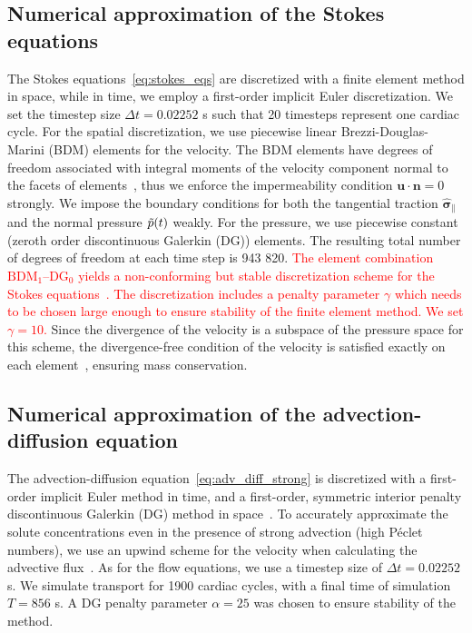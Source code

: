 \documentclass[fleqn]{wlscirep}
\newcommand{\nn}{\mathbf{n}}
\newcommand{\uu}{\mathbf{u}}
\newcommand{\bsig}{\bm{\sigma}}
\newcommand{\bsigpar}{\hat{\bsig}_{\parallel}}
\newcommand{\fixme}[1]{\textcolor{red}{#1}}
\begin{document}
\subsection*{Numerical approximation of the Stokes equations}

The Stokes equations~\eqref{eq:stokes_eqs} are discretized with a finite element method in space, while in time, we employ a first-order implicit Euler discretization.
We set the timestep size $\Delta t = 0.02252$ s such that 20 timesteps represent one cardiac cycle. For the spatial discretization, we use piecewise linear Brezzi-Douglas-Marini (BDM) elements for the velocity.
The BDM elements have degrees of freedom associated with integral moments of the velocity component normal to the facets of elements~\cite{Brezzi1985TwoProblems}, thus we enforce the impermeability condition $\uu\cdot\nn=0$ strongly.
We impose the boundary conditions for both the tangential traction $\bsigpar$ and the normal pressure $\Tilde{p}(t)$ weakly.
For the pressure, we use piecewise constant (zeroth order discontinuous Galerkin (DG)) elements.
The resulting total number of degrees of freedom at each time step is 943 820.
\fixme{The element combination $\mathrm{BDM}_1$--$\mathrm{DG}_{0}$ yields a non-conforming but stable discretization scheme for the Stokes equations~\cite{Stenberg1989SomeEquations}.
The discretization includes a penalty parameter $\gamma$ which needs to be chosen large enough to ensure stability of the finite element method. We set $\gamma=10$.}
Since the divergence of the velocity is a subspace of the pressure space for this scheme, the divergence-free condition of the velocity is satisfied exactly on each element~\cite{Boffi2008FiniteProblem}, ensuring mass conservation. 

\subsection*{Numerical approximation of the advection-diffusion equation}
The advection-diffusion equation~\eqref{eq:adv_diff_strong} is discretized with a first-order implicit Euler method in time, and a first-order,
symmetric interior penalty discontinuous Galerkin (DG) method in space~\cite{Arnold1982AnElements}.
To accurately approximate the solute concentrations even in the presence of strong advection (high Péclet numbers), we use an upwind scheme for the velocity when calculating the advective flux~\cite{Patankar2018NumericalFlow}.
As for the flow equations, we use a timestep size of $\Delta t = 0.02252$ s. We simulate transport for 1900 cardiac cycles, with a final time of simulation $T = 856$ s.
A DG penalty parameter $\alpha = 25$ was chosen to ensure stability of the method. 
\end{document}
